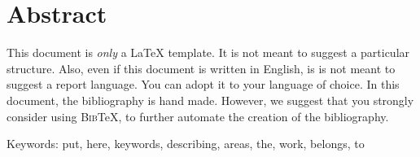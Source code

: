 \thispagestyle{plain}			%
\setlength{\parskip}{0pt plus 1.0pt}
\section*{Abstract}
This document is \emph{only} a \LaTeX{} template. It is not meant to suggest a particular structure. Also, even if this document is written in English, is is not meant to suggest a report language. You can adopt it to your language of choice. In this document, the bibliography is hand made. However, we suggest that you strongly consider using \textsc{Bib}\TeX{}, to further automate the creation of the bibliography.

\vfill
Keywords: put, here, keywords, describing, areas, the, work, belongs, to

\newpage				%
\thispagestyle{empty}
\mbox{}